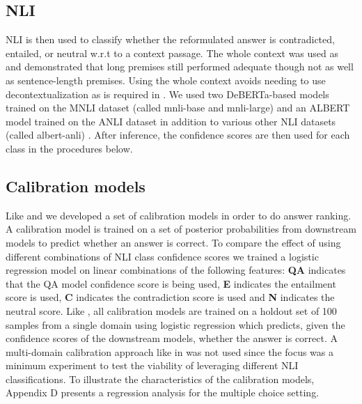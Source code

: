 \documentclass[11pt]{article}
\begin{document}
\subsection{NLI}
NLI is then used to classify whether the reformulated answer is contradicted, entailed, or neutral w.r.t to a context passage. The whole context was used as \citet{schuster_stretching_2022} and \citet{mishra_looking_2021} demonstrated that long premises still performed adequate though not as well as sentence-length premises. Using the whole context avoids needing to use decontextualization as is required in \citet{chen_can_2021}. We used two DeBERTa-based models \citep{he_deberta_2021} trained on the MNLI dataset \citep{williams-etal-2018-mnli} (called mnli-base and mnli-large) and an ALBERT model \citep{albert} trained on the ANLI dataset in addition to various other NLI datasets (called albert-anli) \citep{nie_adversarial_2020}. After inference, the confidence scores are then used for each class in the procedures below.
\subsection{Calibration models}
Like \citet{kamath_selective_2020} and \citet{chen_can_2021} we developed a set of calibration models in order to do answer ranking. A calibration model is trained on a set of posterior probabilities from downstream models to predict whether an answer is correct. To compare the effect of using different combinations of NLI class confidence scores we trained a logistic regression model on linear combinations of the following features: \textbf{QA} indicates that the QA model confidence score is being used, \textbf{E} indicates the entailment score is used, \textbf{C} indicates the contradiction score is used and \textbf{N} indicates the neutral score. Like \citet{chen_can_2021}, all calibration models are trained on a holdout set of 100 samples from a single domain using logistic regression which predicts, given the confidence scores of the downstream models, whether the answer is correct. A multi-domain calibration approach like in \citet{kamath_selective_2020} was not used since the focus was a minimum experiment to test the viability of leveraging different NLI classifications. To illustrate the characteristics of the calibration models, Appendix D presents a regression analysis for the multiple choice setting.
\end{document}
